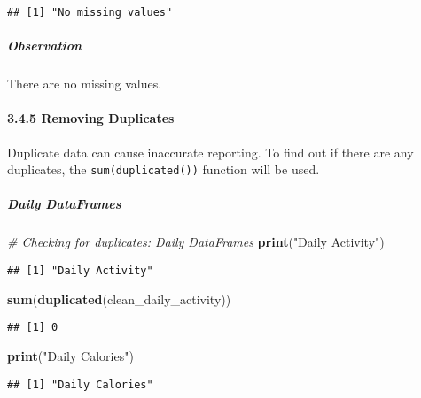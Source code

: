 \documentclass[
]{article}
\newenvironment{Shaded}{\begin{snugshade}}{\end{snugshade}}
\newcommand{\CommentTok}[1]{\textcolor[rgb]{0.56,0.35,0.01}{\textit{#1}}}
\newcommand{\FunctionTok}[1]{\textcolor[rgb]{0.13,0.29,0.53}{\textbf{#1}}}
\newcommand{\NormalTok}[1]{#1}
\newcommand{\StringTok}[1]{\textcolor[rgb]{0.31,0.60,0.02}{#1}}
\begin{document}
\begin{verbatim}
## [1] "No missing values"
\end{verbatim}

\hypertarget{observation-3}{%
\subparagraph{Observation}\label{observation-3}}

There are no missing values.

\hypertarget{removing-duplicates}{%
\paragraph{3.4.5 Removing Duplicates}\label{removing-duplicates}}

Duplicate data can cause inaccurate reporting. To find out if there are
any duplicates, the \texttt{sum(duplicated())} function will be used.

\hypertarget{daily-dataframes-5}{%
\subparagraph{Daily DataFrames}\label{daily-dataframes-5}}

\begin{Shaded}
\begin{Highlighting}[]
\CommentTok{\# Checking for duplicates: Daily DataFrames}
\FunctionTok{print}\NormalTok{(}\StringTok{"Daily Activity"}\NormalTok{)}
\end{Highlighting}
\end{Shaded}

\begin{verbatim}
## [1] "Daily Activity"
\end{verbatim}

\begin{Shaded}
\begin{Highlighting}[]
\FunctionTok{sum}\NormalTok{(}\FunctionTok{duplicated}\NormalTok{(clean\_daily\_activity))}
\end{Highlighting}
\end{Shaded}

\begin{verbatim}
## [1] 0
\end{verbatim}

\begin{Shaded}
\begin{Highlighting}[]
\FunctionTok{print}\NormalTok{(}\StringTok{"Daily Calories"}\NormalTok{)}
\end{Highlighting}
\end{Shaded}

\begin{verbatim}
## [1] "Daily Calories"
\end{verbatim}
\end{document}
